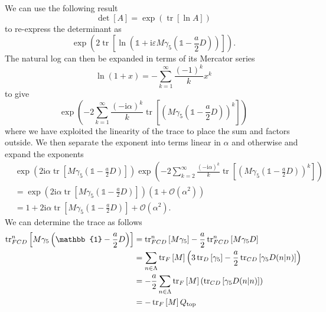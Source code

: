 \documentclass[a4paper,10pt]{article}
\begin{document}
We can use the following result
\begin{equation}
\operatorname{det}[A]=\exp (\operatorname{tr}[\ln A])
\end{equation}
to re-express the determinant as 
\begin{equation*}
\exp \left(2 \operatorname{tr}\left[\ln \left(\mathbb{1}+\mathrm{i} \varepsilon M \gamma_{5}\left(\mathbb{1}-\frac{a}{2} D\right)\right)\right]\right).
\end{equation*}
The natural log can then be expanded in terms of its Mercator series
\begin{equation}
\ln (1+x)=-\sum_{k=1}^{\infty} \frac{(-1)^{k}}{k} x^{k}
\end{equation}
to give 
\begin{equation*}
\exp \left(-2 \sum_{k=1}^{\infty} \frac{(-\mathrm{i} \alpha)^{k}}{k} \operatorname{tr}\left[\left(M \gamma_{5}\left(\mathbb{1}-\frac{a}{2} D\right)\right)^{k}\right]\right)
\end{equation*}
where we have exploited the linearity of the trace to place the sum and factors outside. We then separate the exponent into terms linear in $\alpha$ and otherwise and expand the exponents
\begin{equation}
\begin{aligned} 
 &\exp \left(2\mathrm{i} \alpha \operatorname{tr}\left[M \gamma_{5}\left(\mathbb{1}-\frac{a}{2} D\right)\right]\right)
\exp \left(-2 \sum_{k=2}^{\infty} \frac{(-\mathrm{i} \alpha)^{k}}{k} \operatorname{tr}\left[\left(M \gamma_{5}\left(\mathbb{1}-\frac{a}{2} D\right)\right)^{k}\right]\right)\\ &=\exp \left(2\mathrm{i} \alpha \operatorname{tr}\left[M \gamma_{5}\left(\mathbb{1}-\frac{a}{2} D\right)\right]\right)\left( \mathbb{1}+\mathcal{O}(\alpha^2) \right)\\&=1+2 \mathrm{i} \alpha \operatorname{tr}\left[M \gamma_{5}\left(\mathbb{1}-\frac{a}{2} D\right)\right]+\mathcal{O}\left(\alpha^{2}\right).
\end{aligned}
\end{equation}
We can determine the trace as follows
\begin{equation}
\begin{aligned} 
\operatorname{tr}_{FCD}^n\left[M \gamma_{5}\left(\mathbb{1}-\frac{a}{2} D\right)\right] &= \operatorname{tr}_{FCD}^n\left[M \gamma_{5}\right]-\frac{a}{2}\operatorname{tr}_{FCD}^n\left[ M \gamma_{5}D \right]\\&=\sum_{n \in \Lambda}\operatorname{tr}_{F}\left[M\right]\left( 3\operatorname{tr}_{D}\left[\gamma_{5}\right]-\frac{a}{2}\operatorname{tr}_{CD}\left[\gamma_{5}D(n\mkern-5mu\mid\mkern-5mu n) \right] \right)\\&=-\frac{a}{2}\sum_{n \in \Lambda}\operatorname{tr}_{F}\left[M\right]\left( \operatorname{tr}_{CD}\left[\gamma_{5}D(n\mkern-5mu\mid\mkern-5mu n) \right] \right)\\&=-\operatorname{tr}_{F}\left[M\right]Q_{\mathrm{top}}
\end{aligned}
\end{equation}
\end{document}

